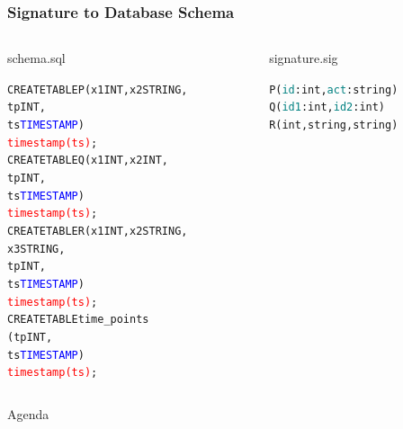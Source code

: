 \begin{frame}[fragile]
    \frametitle{Signature to Database Schema}
\begin{columns}
    \begin{column}{0.68\textwidth}
        \vspace{-0.5cm}
        \begin{center}
            schema.sql
        \end{center}
        \vspace{-0.6cm}
\begin{tcolorbox}
\begin{alltt}
CREATE TABLE P(x1 INT,x2 STRING,
               tp INT,
               ts \textcolor{blue}{TIMESTAMP})
               \textcolor{red}{timestamp(ts)};
CREATE TABLE Q(x1 INT,x2 INT,
               tp INT,
               ts \textcolor{blue}{TIMESTAMP})
               \textcolor{red}{timestamp(ts)};
CREATE TABLE R(x1 INT,x2 STRING,
               x3 STRING,
               tp INT,
               ts \textcolor{blue}{TIMESTAMP})
               \textcolor{red}{timestamp(ts)};
CREATE TABLE time_points
               (tp INT,
               ts \textcolor{blue}{TIMESTAMP})
               \textcolor{red}{timestamp(ts)};
\end{alltt}
\end{tcolorbox}
    \end{column}
    \begin{column}{0.45\textwidth}
        \begin{center}
            signature.sig
        \end{center}
        \vspace{-0.6cm}
\begin{tcolorbox}
\begin{alltt}
P(\textcolor{teal}{id}:int,\textcolor{teal}{act}:string)
Q(\textcolor{teal}{id1}:int,\textcolor{teal}{id2}:int)
R(int,string,string)
\end{alltt}
\end{tcolorbox}
\vspace{1.1cm}
        
    \end{column}
\end{columns}
\end{frame}

\begin{frame}{Agenda}
    \tableofcontents
\end{frame}